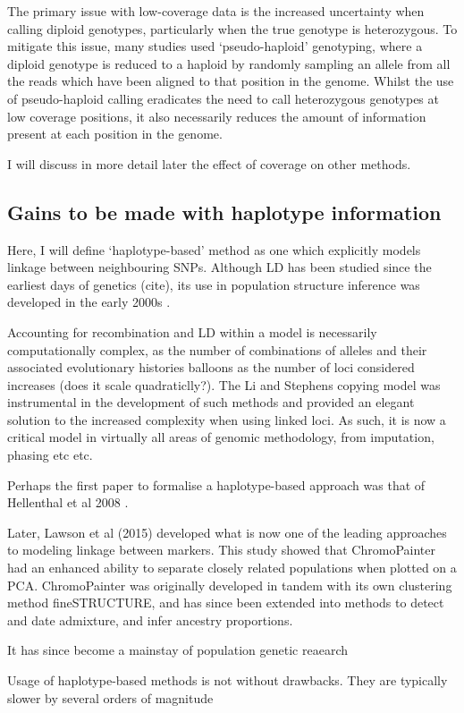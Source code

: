 The primary issue with low-coverage data is the increased uncertainty when calling diploid genotypes, particularly when the true genotype is heterozygous. To mitigate this issue, many studies used `pseudo-haploid' genotyping, where a diploid genotype is reduced to a haploid by randomly sampling an allele from all the reads which have been aligned to that position in the genome. Whilst the use of pseudo-haploid calling eradicates the need to call heterozygous genotypes at low coverage positions, it also necessarily reduces the amount of information present at each position in the genome.

I will discuss in more detail later the effect of coverage on other methods. 

\subsection{Gains to be made with haplotype information}

Here, I will define `haplotype-based' method as one which explicitly models linkage between neighbouring SNPs. Although LD has been studied since the earliest days of genetics (cite), its use in population structure inference was  developed in the early 2000s \cite{conrad2006worldwide}.

Accounting for recombination and LD within a model is necessarily computationally complex, as the number of combinations of alleles and their associated evolutionary histories balloons as the number of loci considered increases (does it scale quadraticlly?). The Li and Stephens copying model was instrumental in the development of such methods \cite{song2016li} and provided an elegant solution to the increased complexity when using linked loci. As such, it is now a critical model in virtually all areas of genomic methodology, from imputation, phasing etc etc. 

Perhaps the first paper to formalise a haplotype-based approach was that of Hellenthal et al 2008 \cite{hellenthal2008inferring}.

Later, Lawson et al (2015) \cite{Lawson2012} developed what is now one of the leading approaches to modeling linkage between markers. This study showed that ChromoPainter had an enhanced ability to separate closely related populations when plotted on a PCA. ChromoPainter was originally developed in tandem with its own clustering method fineSTRUCTURE, and has since been extended into methods to detect and date admixture, and infer ancestry proportions. 

It has since become a mainstay of population genetic reaearch

Usage of haplotype-based methods is not without drawbacks. They are typically slower by several orders of magnitude 
